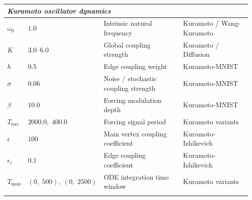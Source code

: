\documentclass{article}
\begin{document}
\begin{longtable}{@{}llll@{}}
\multicolumn{4}{l}{\textit{Kuramoto oscillator dynamics}} \\
\midrule
$\omega_0$        & $1.0$                     & Intrinsic natural frequency                 & Kuramoto / Wang-Kuramoto \\
$K$               & $3.0$--$6.0$              & Global coupling strength                    & Kuramoto / Diffusion \\
$h$               & $0.5$                     & Edge coupling weight                        & Kuramoto-MNIST \\
$\sigma$          & $0.06$                    & Noise / stochastic coupling strength        & Kuramoto-MNIST \\
$\beta$           & $10.0$                    & Forcing modulation depth                    & Kuramoto-MNIST \\
$T_{\text{forc}}$ & $2000.0,\;400.0$          & Forcing signal period                       & Kuramoto variants \\
$\epsilon$        & $100$                     & Main vertex coupling coefficient            & Kuramoto-Izhikevich \\
$\epsilon_c$      & $0.1$                     & Edge coupling coefficient                   & Kuramoto-Izhikevich \\
$T_{\text{span}}$ & $(0,\;500),\;(0,\;2500)$  & ODE integration time window                 & Kuramoto variants \\
\addlinespace


\end{longtable}
\end{document}
